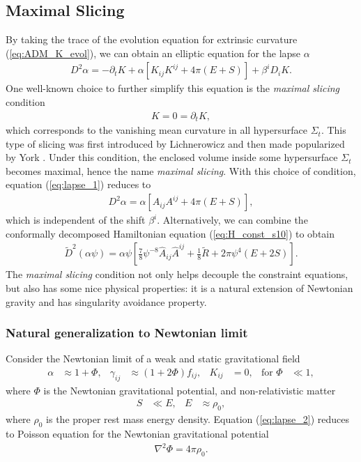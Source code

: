 \subsection{Maximal Slicing} 
\label{section1.4.1}
By taking the trace of the evolution equation for extrinsic curvature (\ref{eq:ADM_K_evol}),
we can obtain an elliptic equation for the lapse $\alpha$
\begin{align}\label{eq:lapse_1}
    D^2 \alpha = - \partial_t K + \alpha \left[ K_{ij} K^{ij} + 4\pi\left(E+S\right) \right] + \beta^i D_i K.
\end{align}
One well-known choice to further simplify this equation is the \textit{maximal slicing} condition
\begin{align}\label{eq:max_slicing}
    K = 0 = \partial_t K,
\end{align}
which corresponds to the vanishing mean curvature in all hypersurface $\Sigma_t$.
This type of slicing was first introduced by Lichnerowicz \cite{lichnerowicz1944integration}
and then made popularized by York \cite{smarr1979sources,smarr1978radiation}.
Under this condition, the enclosed volume inside some hypersurface $\Sigma_t$ becomes maximal,
hence the name \textit{maximal slicing}.
With this choice of condition, equation (\ref{eq:lapse_1}) reduces to
\begin{align}\label{eq:lapse_2}
    D^2 \alpha = \alpha \left[ A_{ij} A^{ij} + 4\pi\left(E+S\right) \right],
\end{align}
which is independent of the shift $\beta^i$.
Alternatively, we can combine the conformally decomposed Hamiltonian equation (\ref{eq:H_const_s10}) to obtain
\begin{align}\label{eq:lapse_con}
    \tilde{D}^2 \left(\alpha \psi \right) = \alpha \psi \left[ \frac{7}{8} \psi^{-8} \hat{A}_{ij} \hat{A}^{ij} + \frac{1}{8} \tilde{R}
    + 2 \pi \psi^4 \left(E + 2 S \right) \right].
\end{align}
The \textit{maximal slicing} condition not only helps decouple the constraint equations,
but also has some nice physical properties:
it is a natural extension of Newtonian gravity and has singularity avoidance property.

\subsubsection{Natural generalization to Newtonian limit}
Consider the Newtonian limit of a weak and static gravitational field
\begin{align}
    \alpha &\approx 1 + \Phi, & \gamma_{ij} &\approx \left(1 + 2\Phi \right) f_{ij}, & K_{ij} &=0, & \text{for } \Phi &\ll 1,
\end{align}
where $\Phi$ is the Newtonian gravitational potential,
and non-relativistic matter
\begin{align}
    S &\ll E, & E &\approx \rho_0,
\end{align}
where $\rho_0$ is the proper rest mass energy density.
Equation (\ref{eq:lapse_2}) reduces to Poisson equation for the Newtonian gravitational potential
\begin{align}
    \nabla^2 \Phi = 4\pi \rho_0.
\end{align}

